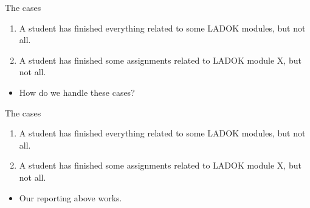 \begin{frame}[fragile]
  \begin{block}{The cases}
    \begin{enumerate}
      \item A student has finished everything related to some LADOK modules, 
        but not all.
      \item A student has finished some assignments related to LADOK module X, 
        but not all.
    \end{enumerate}
  \end{block}

  \begin{question}
    \begin{itemize}
      \item How do we handle these cases?
    \end{itemize}
  \end{question}
\end{frame}

\begin{frame}[fragile]
  \begin{block}{The cases}
    \begin{enumerate}
      \item A student has finished everything related to some LADOK modules, 
        but not all.
      \item A student has finished some assignments related to LADOK module X, 
        but not all.
    \end{enumerate}
  \end{block}

  \begin{solution}[Case 1]
    \begin{itemize}
      \item Our reporting above works.
    \end{itemize}
  \end{solution}
\end{frame}

